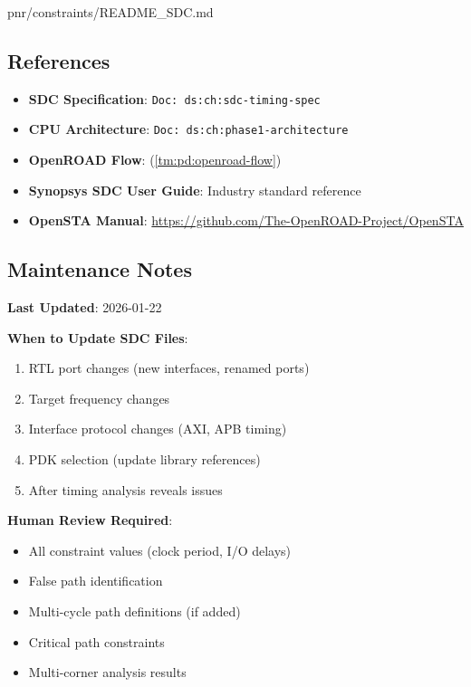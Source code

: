 \begin{relocated}{pnr/constraints/README_SDC.md}
\subsection{References}\label{tm:pd:constraints-readme-sdc:references}

\begin{itemize}
\tightlist
\item
  \textbf{SDC Specification}:
  \texttt{Doc:\allowbreak{}\ ds:\allowbreak{}ch:\allowbreak{}sdc-\allowbreak{}timing-\allowbreak{}spec}
\item
  \textbf{CPU Architecture}:
  \texttt{Doc:\allowbreak{}\ ds:\allowbreak{}ch:\allowbreak{}phase1-\allowbreak{}architecture}
\item
  \textbf{OpenROAD Flow}:  (\cref{tm:pd:openroad-flow})
\item
  \textbf{Synopsys SDC User Guide}: Industry standard reference
\item
  \textbf{OpenSTA Manual}:
  \href{https://github.com/The-OpenROAD-Project/OpenSTA}{https:/\allowbreak{}/\allowbreak{}github.com/\allowbreak{}The-OpenROAD-Project/\allowbreak{}OpenSTA}
\end{itemize}

\subsection{Maintenance Notes}\label{tm:pd:constraints-readme-sdc:maintenance-notes}

\textbf{Last Updated}: 2026-01-22

\textbf{When to Update SDC Files}:

\begin{enumerate}
\def\labelenumi{\arabic{enumi}.}
\tightlist
\item
  RTL port changes (new interfaces, renamed ports)
\item
  Target frequency changes
\item
  Interface protocol changes (AXI, APB timing)
\item
  PDK selection (update library references)
\item
  After timing analysis reveals issues
\end{enumerate}

\textbf{Human Review Required}:

\begin{itemize}
\tightlist
\item
  All constraint values (clock period, I/O delays)
\item
  False path identification
\item
  Multi-cycle path definitions (if added)
\item
  Critical path constraints
\item
  Multi-corner analysis results
\end{itemize}
\end{relocated}


